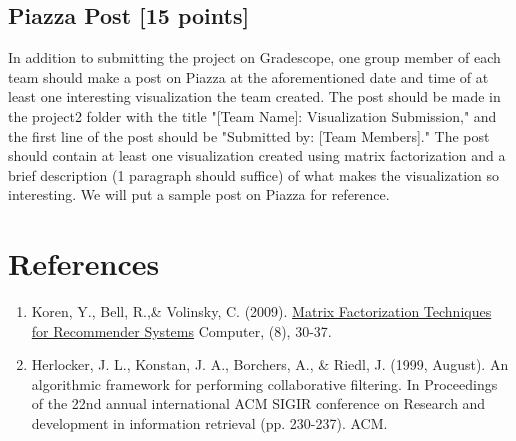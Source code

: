 \subsection{Piazza Post [15 points]}
In addition to submitting the project on Gradescope, one group member of each team should make a post on Piazza at the aforementioned date and time of at least one interesting visualization the team created. The post should be made in the project2 folder with the title "[Team Name]: Visualization Submission," and the first line of the post should be "Submitted by: [Team Members]." The post should contain at least one visualization created using matrix factorization and a brief description (1 paragraph should suffice) of what makes the visualization so interesting. We will put a sample post on Piazza for reference.


\section*{References}
\begin{enumerate}
	\item Koren, Y., Bell, R.,\&  Volinsky, C. (2009). \href{https://datajobs.com/data-science-repo/Recommender-Systems-\%5BNetflix\%5D.pdf}{Matrix Factorization Techniques for Recommender Systems} Computer, (8), 30-37.
	\item Herlocker, J. L., Konstan, J. A., Borchers, A., \& Riedl, J. (1999, August). An algorithmic framework for performing collaborative filtering. In Proceedings of the 22nd annual international ACM SIGIR conference on Research and development in information retrieval (pp. 230-237). ACM.
\end{enumerate}


